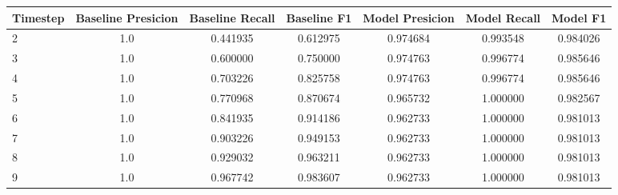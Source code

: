 \begin{tabular}{lcccccc}
\toprule
 Timestep &  Baseline Presicion &  Baseline Recall &  Baseline F1 &  Model Presicion &  Model Recall &  Model F1 \\
\midrule
        2 &                 1.0 &         0.441935 &     0.612975 &         0.974684 &      0.993548 &  0.984026 \\
        3 &                 1.0 &         0.600000 &     0.750000 &         0.974763 &      0.996774 &  0.985646 \\
        4 &                 1.0 &         0.703226 &     0.825758 &         0.974763 &      0.996774 &  0.985646 \\
        5 &                 1.0 &         0.770968 &     0.870674 &         0.965732 &      1.000000 &  0.982567 \\
        6 &                 1.0 &         0.841935 &     0.914186 &         0.962733 &      1.000000 &  0.981013 \\
        7 &                 1.0 &         0.903226 &     0.949153 &         0.962733 &      1.000000 &  0.981013 \\
        8 &                 1.0 &         0.929032 &     0.963211 &         0.962733 &      1.000000 &  0.981013 \\
        9 &                 1.0 &         0.967742 &     0.983607 &         0.962733 &      1.000000 &  0.981013 \\
\bottomrule
\end{tabular}
